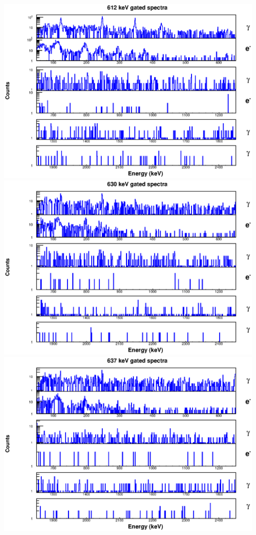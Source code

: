 \begin{landscape}
\includegraphics[scale=1.1]{154Gd_Appendix/612_combined.eps}
\includegraphics[scale=1.1]{154Gd_Appendix/630_combined.eps}
\includegraphics[scale=1.1]{154Gd_Appendix/637_combined.eps}

\end{landscape}
